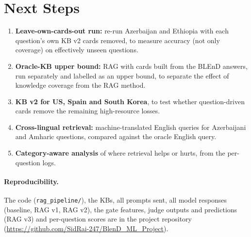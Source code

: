 \documentclass[11pt]{article}
\begin{document}
\section{Next Steps}
\begin{enumerate}
\item \textbf{Leave-own-cards-out run:} re-run Azerbaijan and Ethiopia with each question's own KB v2
cards removed, to measure accuracy (not only coverage) on effectively unseen questions.
\item \textbf{Oracle-KB upper bound:} RAG with cards built from the BLEnD answers, run separately and
labelled as an upper bound, to separate the effect of knowledge coverage from the RAG method.
\item \textbf{KB v2 for US, Spain and South Korea}, to test whether question-driven cards remove the
remaining high-resource losses.
\item \textbf{Cross-lingual retrieval:} machine-translated English queries for Azerbaijani and Amharic
questions, compared against the oracle English query.
\item \textbf{Category-aware analysis} of where retrieval helps or hurts, from the per-question logs.
\end{enumerate}

\paragraph{Reproducibility.} The code (\texttt{rag\_pipeline/}), the KBs, all prompts sent, all model
responses (baseline, RAG v1, RAG v2), the gate features, judge outputs and predictions (RAG v3) and per-question scores are in the project repository
(\url{https://github.com/SidRai-247/BlenD_ML_Project}).
\end{document}
